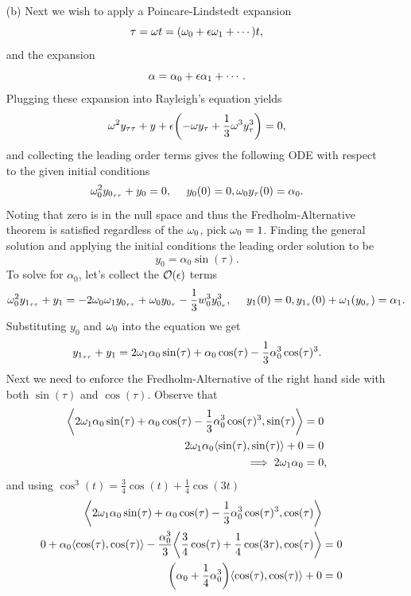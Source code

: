 \documentclass[12pt]{report}
\begin{document}
\begin{solution}
\begin{enumerate}
        \item [(b)]
        Next we wish to apply a Poincare-Lindstedt expansion 
        \[ 
            \tau = \omega t = (\omega_0 + {\epsilon}\omega_1 + \cdots)t,
        \]
        and the expansion
        \[ 
            \alpha = \alpha_0 + {\epsilon}\alpha_1 + \cdots.
        \]
        Plugging these expansion into Rayleigh's equation yields
        \[ 
            \omega^2 y_{\tau \tau} + y + {\epsilon}{\left(-\omega y_\tau + \frac{1}{3}\omega^3 y_\tau^3\right)} = 0,
        \]
        and collecting the leading order terms gives the following ODE with respect to the given initial conditions
        \[ 
            \omega_0^2 y_{0_{\tau \tau}} + y_0 = 0, ~~~~ y_0(0) = 0, \omega_0y_\tau(0)=\alpha_0.
        \]
        Noting that zero is in the null space and thus the Fredholm-Alternative theorem is satisfied regardless of the $\omega_0$, pick $\omega_0 = 1$. Finding the general solution and applying the initial conditions the leading order solution to be
        \[ 
            y_0 = \alpha_0 \sin(\tau). 
        \]
        To solve for $\alpha_0$, let's collect the ${\mathcal{O}}({\epsilon})$ terms
        \[ 
            \omega_0^2y_{1_{\tau\tau}} + y_1 = -2\omega_0\omega_1y_{0_{\tau\tau}} + \omega_0y_{0_\tau} - \frac{1}{3}w_0^3y_{0_\tau}^3, ~~~~ y_1(0)=0,y_{1_\tau}(0) + \omega_1(y_{0_\tau}) = \alpha_1. 
        \] 
        Substituting $y_0$ and $\omega_0$ into the equation we get
        \[ 
            y_{1_{\tau\tau}} + y_1 = 2\omega_1\alpha_0\sin(\tau) + \alpha_0\cos(\tau)- \frac{1}{3}\alpha_0^3\cos(\tau)^3.
        \]
        Next we need to enforce the Fredholm-Alternative of the right hand side with both $\sin(\tau)$ and $\cos(\tau)$. Observe that
        \begin{align*}
            {\left\langle2\omega_1\alpha_0\sin(\tau) + \alpha_0\cos(\tau)- \frac{1}{3}\alpha_0^3\cos(\tau)^3,\sin(\tau)\right\rangle} &= 0\\
            2\omega_1\alpha_0{\left\langle\sin(\tau),\sin(\tau)\right\rangle} + 0 &= 0\\
            \implies 2\omega_1\alpha_0 &= 0,
        \end{align*}
        and using $\cos^3(t) = \frac{3}{4}\cos(t) + \frac{1}{4}\cos(3t)$
        \begin{align*}
            \abrac{2\w_1\alpha_0\sin(\tau) + \alpha_0\cos(\tau)- \frac{1}{3}\alpha_0^3\cos(\tau)^3,\cos(\tau)} \\
            0 + \alpha_0 \abrac{\cos(\tau),\cos(\tau)}  - \frac{\alpha_0^3}{3}\abrac{\frac{3}{4}\cos(\tau)+\frac{1}{4}\cos(3\tau),\cos(\tau)} &= 0\\
            \paren{\alpha_0 + \frac{1}{4}\alpha_0^3}\abrac{\cos(\tau),\cos(\tau)} + 0 &= 0\\

\end{align*}
\end{enumerate}
\end{solution}
\end{document}
